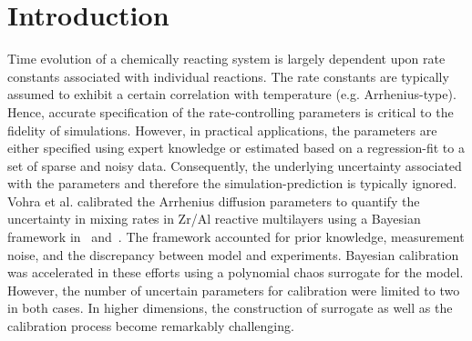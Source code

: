 \section{Introduction}
\label{sec:intro}



Time evolution of a chemically reacting system is largely dependent upon rate constants
associated with individual reactions. The rate constants are typically assumed to exhibit
a certain correlation with temperature (e.g. Arrhenius-type). Hence, accurate specification
of the rate-controlling parameters is critical to the fidelity of simulations. However,
in practical applications, the parameters are either specified using expert knowledge or
estimated based on a regression-fit to a set of sparse and noisy data. Consequently, the
underlying uncertainty associated with the parameters and therefore the simulation-prediction
is typically ignored. Vohra et al. calibrated the Arrhenius diffusion parameters to quantify
the uncertainty in mixing rates in Zr/Al reactive multilayers using a Bayesian framework
in~\cite{Vohra:2014} and~\cite{Vohra:2017}. The framework accounted for prior knowledge,
measurement noise, and the discrepancy between model and experiments. Bayesian calibration
was accelerated in these efforts using a polynomial chaos surrogate for the model. However,
the number of uncertain parameters for calibration were limited to two in both cases. In
higher dimensions, the construction of surrogate as well as the calibration process become
remarkably challenging.      

